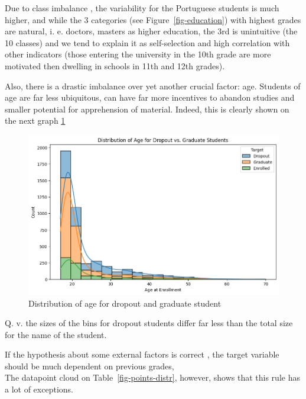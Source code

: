 \documentclass[
  letterpaper,
  DIV=11,
  numbers=noendperiod]{scrartcl}
\begin{document}
Due to class imbalance , the variability for the Portuguese students is
much higher, and while the 3 categories (see Figure~\ref{fig-education})
with highest grades are natural, i. e. doctors, masters as higher
education, the 3rd is unintuitive (the 10 classes) and we tend to
explain it as self-selection and high correlation with other indicators
(those entering the university in the 10th grade are more motivated then
dwelling in schools in 11th and 12th grades).

Also, there is a drastic imbalance over yet another crucial factor: age.
Students of age are far less ubiquitous, can have far more incentives to
abandon studies and smaller potential for apprehension of material.
Indeed, this is clearly shown on the next graph \ref{fig-age-distr}

\begin{figure}

{\centering \includegraphics{report_AzadhdhinNedalYunisAlFraijat_files/figure-pdf/fig-age-distr-output-1.png}

}

\caption{\label{fig-age-distr}Distribution of age for dropout and
graduate student}

\end{figure}

Q. v. the sizes of the bins for dropout students differ far less than
the total size for the name of the student.

If the hypothesis about some external factors is correct , the target
variable should be much dependent on previous grades,\\
The datapoint cloud on Table~\ref{fig-points-distr}, however, shows that
this rule has a lot of exceptions.
\end{document}
